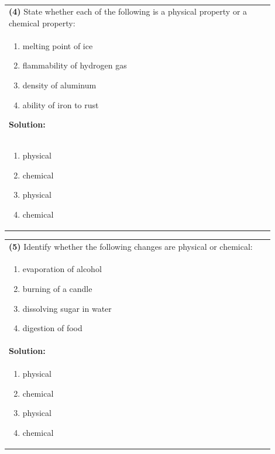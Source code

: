 \documentclass{article}
\begin{document}
\newpage
\\
\begin{tabular}{|p{0.9\linewidth}|}
\hline
\vspace{0.2cm}

\textbf{(4)} State whether each of the following is a physical property or a chemical property: \\
\begin{enumerate}
    \item melting point of ice
    \item flammability of hydrogen gas
    \item density of aluminum
    \item ability of iron to rust
\end{enumerate}
\hline

\textbf{Solution:} \\
\begin{enumerate}
    \item physical
    \item chemical
    \item physical
    \item chemical 
\end{enumerate}
\\
\hline
\end{tabular}
\newpage
\begin{tabular}{|p{0.9\linewidth}|}
\hline
\vspace{0.2cm}

\textbf{(5)} Identify whether the following changes are physical or chemical: \\
\begin{enumerate}
    \item evaporation of alcohol
    \item burning of a candle
    \item dissolving sugar in water
    \item digestion of food
\end{enumerate} \\
\hline
\textbf{Solution:} \\
\begin{enumerate}
    \item physical
    \item chemical
    \item physical
    \item chemical
\end{enumerate}
\\
\hline
\end{tabular}
\end{document}
